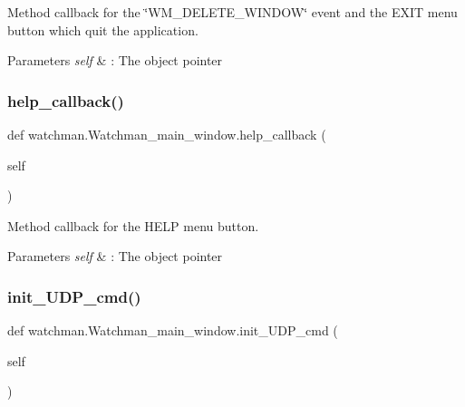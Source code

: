 Method callback for the \char`\"{}\+W\+M\+\_\+\+D\+E\+L\+E\+T\+E\+\_\+\+W\+I\+N\+D\+O\+W\char`\"{} event and the E\+X\+IT menu button which quit the application. 


\begin{DoxyParams}{Parameters}
{\em self} & \+: The object pointer \\
\hline
\end{DoxyParams}
\mbox{\label{classwatchman_1_1_watchman__main__window_ae4234a2c7ef7fa102846ee2cc3089181}} 
\subsubsection{\texorpdfstring{help\_callback()}{help\_callback()}}
{\footnotesize\ttfamily def watchman.\+Watchman\+\_\+main\+\_\+window.\+help\+\_\+callback (\begin{DoxyParamCaption}\item[{}]{self }\end{DoxyParamCaption})}



Method callback for the H\+E\+LP menu button. 


\begin{DoxyParams}{Parameters}
{\em self} & \+: The object pointer \\
\hline
\end{DoxyParams}
\mbox{\label{classwatchman_1_1_watchman__main__window_a0a178263901747708694c0fd4aa2e3a7}} 
\subsubsection{\texorpdfstring{init\_UDP\_cmd()}{init\_UDP\_cmd()}}
{\footnotesize\ttfamily def watchman.\+Watchman\+\_\+main\+\_\+window.\+init\+\_\+\+U\+D\+P\+\_\+cmd (\begin{DoxyParamCaption}\item[{}]{self }\end{DoxyParamCaption})}



